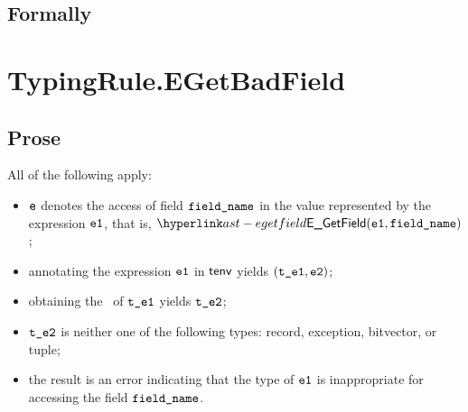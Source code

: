 \subsection{Formally}
\begin{mathpar}
\end{mathpar}


\section{TypingRule.EGetBadField \label{sec:TypingRule.EGetBadField}}

\subsection{Prose}
All of the following apply:
\begin{itemize}
  \item $\ve$ denotes the access of field $\fieldname$ in the value represented by the expression $\veone$, that is, $\EGetField(\veone, \fieldname)$;
  \item annotating the expression $\veone$ in $\tenv$ yields $(\vteone, \vetwo)$\ProseOrTypeError;
  \item obtaining the \underlyingtype\ of $\vteone$ yields $\vtetwo$\ProseOrTypeError;
  \item $\vtetwo$ is neither one of the following types: record, exception, bitvector, or tuple;
  \item the result is an error indicating that the type of $\veone$ is inappropriate for accessing the field $\fieldname$.
\end{itemize}

